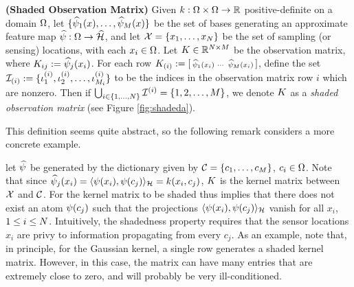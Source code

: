 \begin{definition}\label{def:shaded}
\textbf{(Shaded Observation Matrix)} Given $k:\Omega\times\Omega\to\mathbb{R}$ positive-definite on a domain $\Omega$, let $\{\widehat{\psi}_1(x), \dots, \widehat{\psi}_{M}(x)\}$ be the set of bases generating an approximate feature map $\widehat{\psi}:\Omega\to\widehat{\mathcal{H}}$, and let
$\mathcal{X} = \{x_1, \dots, x_{N}\}$ be the set of sampling (or sensing) locations, with each $x_i\in\Omega$. 
Let $K\in\mathbb{R}^{N\times M}$ be the observation matrix, where $ K_{ij} := \widehat{\psi}_j(x_i)$. For each
row $K_{(i)} := \left[\begin{smallmatrix}
  \widehat{\psi}_1(x_i) & \cdots & \widehat{\psi}_{M}(x_i)
 \end{smallmatrix}\right]$, define the set 
$\mathcal{I}_{(i)} := \{\iota_1^{(i)},\iota_2^{(i)},\dots, \iota_{M_i}^{(i)}\}$ to be the indices in the observation
matrix row $i$ which are nonzero. 
Then if 
$\bigcup_{i\in\{1,\dots,N\}} \mathcal{I}^{(i)} = \{1,2,\dots, M\}$,
we denote $K$ as a \emph{shaded observation matrix} (see Figure \ref{fig:shadeda}).
\end{definition}

This definition seems quite abstract, so the following remark considers a more concrete example.

\begin{remark}\label{rem:shaded}
 let $\widehat{\psi}$ be generated by the dictionary given by $\mathcal{C} = \{c_1,\dots,c_{M}\}$, $c_i\in\Omega$. Note that since $\widehat{\psi}_j(x_i) = \langle\psi(x_i), \psi(c_j)\rangle_{\mathcal{H}} = k(x_i,c_j)$, $K$ is the kernel matrix between $\mathcal{X}$ and $\mathcal{C}$. For the kernel matrix to be shaded thus implies that there does not exist an atom $\psi(c_j)$ such that the projections $\langle\psi(x_i),\psi(c_j)\rangle_{\mathcal{H}}$ vanish for all $x_i$, $1\leq i\leq N$. Intuitively, the shadedness property requires that the sensor locations $x_i$ are privy to information propagating from every $c_j$. As an example, note that, in principle, for the Gaussian kernel, a single row generates a shaded kernel matrix. However, in this case, the matrix can have many entries that are extremely close to zero, and will probably be very ill-conditioned.  
\end{remark}


